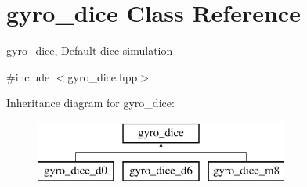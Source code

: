 \hypertarget{classgyro__dice}{}\section{gyro\+\_\+dice Class Reference}
\label{classgyro__dice}


\hyperlink{classgyro__dice}{gyro\+\_\+dice}, Default dice simulation  




{\ttfamily \#include $<$gyro\+\_\+dice.\+hpp$>$}

Inheritance diagram for gyro\+\_\+dice\+:\begin{figure}[H]
\begin{center}
\leavevmode
\includegraphics[height=2.000000cm]{classgyro__dice}
\end{center}
\end{figure}
